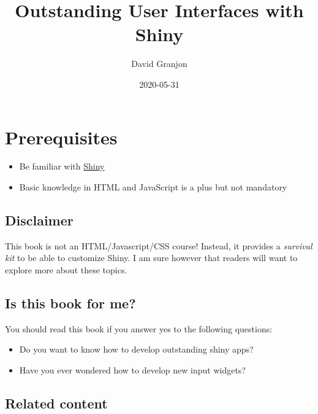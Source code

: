 \documentclass[
]{book}
\title{Outstanding User Interfaces with Shiny}
\author{David Granjon}
\date{2020-05-31}
\providecommand{\tightlist}{%
  \setlength{\itemsep}{0pt}\setlength{\parskip}{0pt}}
\begin{document}
\maketitle

{
\setcounter{tocdepth}{1}
\tableofcontents
}
\hypertarget{prerequisites}{%
\chapter*{Prerequisites}\label{prerequisites}}

\begin{itemize}
\tightlist
\item
  Be familiar with \href{https://mastering-shiny.org}{Shiny}
\item
  Basic knowledge in HTML and JavaScript is a plus but not mandatory
\end{itemize}

\hypertarget{disclaimer}{%
\section*{Disclaimer}\label{disclaimer}}

This book is not an HTML/Javascript/CSS course! Instead, it provides a \emph{survival kit} to be able to customize Shiny. I am sure however that readers will want to explore more about these topics.

\hypertarget{is-this-book-for-me}{%
\section*{Is this book for me?}\label{is-this-book-for-me}}

You should read this book if you answer yes to the following questions:

\begin{itemize}
\tightlist
\item
  Do you want to know how to develop outstanding shiny apps?
\item
  Have you ever wondered how to develop new input widgets?
\end{itemize}

\hypertarget{related-content}{%
\section*{Related content}\label{related-content}}
\end{document}
